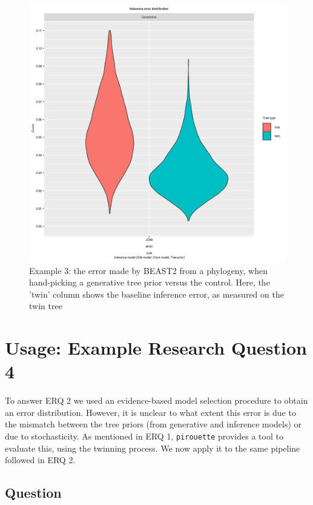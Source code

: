 \documentclass{article}
\begin{document}
\begin{figure}[ht]
  \includegraphics[width=\textwidth]{example_3/errors.png}
  \caption{
    Example 3: the error made by BEAST2 from a phylogeny, 
    when hand-picking a generative tree prior versus the control.
    Here, the 'twin' column shows the baseline inference error,
    as measured on the twin tree
  }
  \label{fig:example_3}
\end{figure}

\section{Usage: Example Research Question 4}

To answer ERQ 2 we used an evidence-based model selection procedure to obtain 
an 
error distribution.
However, it is unclear to what extent this error is due to the mismatch between 
the tree priors (from generative and inference models) or due to stochasticity. 
As mentioned in ERQ 1, \verb;pirouette; provides a tool to evaluate this, using 
the twinning process. We now apply it to the same pipeline followed in ERQ 2.

\subsection{Question}
\end{document}

